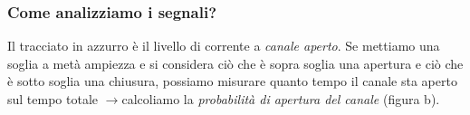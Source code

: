 \documentclass[a4paper,12pt]{article}
\newcommand{\lfreccia}{\ensuremath{\longrightarrow}}
\begin{document}
\subsubsection{Come analizziamo i segnali?}

\begin{figure}[H]
 \centering
\label{img:a} \quad
{}
\end{figure}

Il tracciato in azzurro è il livello di corrente a \emph{canale aperto}. Se mettiamo una soglia a metà ampiezza e si considera ciò che è sopra soglia una apertura e ciò che è sotto soglia una chiusura, possiamo misurare quanto tempo  il canale sta aperto sul tempo totale \lfreccia calcoliamo la \emph{probabilità di apertura del canale} (figura b).
\end{document}
